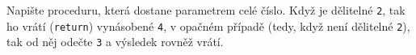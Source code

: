 \question[30]
Napište proceduru, která dostane parametrem celé číslo. Když je dělitelné
\texttt{2}, tak ho vrátí (\texttt{return}) vynásobené \texttt{4}, v opačném
případě (tedy, když není dělitelné \texttt{2}), tak od něj odečte \texttt{3} a
výsledek rovněž vrátí.